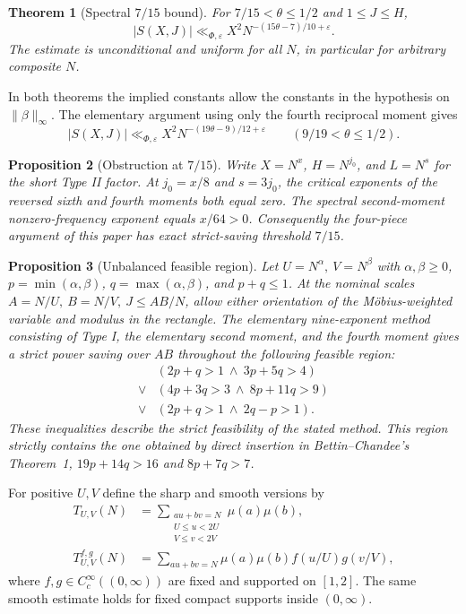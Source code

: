 \documentclass[11pt]{amsart}
\numberwithin{equation}{section}
\newtheorem{theorem}{Theorem}[section]
\newtheorem{proposition}[theorem]{Proposition}
\theoremstyle{remark}
\begin{document}
\begin{theorem}[Spectral \(7/15\) bound]\label{thm:spectral}
For \(7/15<\theta\le1/2\) and \(1\le J\le H\),
\[
 |S(X,J)|\ll_{\Phi,\varepsilon} X^2 N^{-(15\theta-7)/10+\varepsilon}.
\]
The estimate is unconditional and uniform for all \(N\), in particular
for arbitrary composite \(N\).
\end{theorem}

In both theorems the implied constants allow the constants in the
hypothesis on \(\|\beta\|_\infty\). The elementary argument using only
the fourth reciprocal moment gives
\[
 |S(X,J)|\ll_{\Phi,\varepsilon}X^2N^{-(19\theta-9)/12+\varepsilon}
 \qquad(9/19<\theta\le1/2).
\]

\begin{proposition}[Obstruction at \(7/15\)]\label{prop:obstruction}
Write \(X=N^x\), \(H=N^{j_0}\), and \(L=N^s\) for the short Type II
factor. At \(j_0=x/8\) and \(s=3j_0\), the critical exponents of
the reversed sixth and fourth moments both equal zero. The spectral
second-moment nonzero-frequency exponent equals \(x/64>0\).
Consequently the four-piece argument of this paper has exact
strict-saving threshold \(7/15\).
\end{proposition}

\begin{proposition}[Unbalanced feasible region]\label{prop:unbalanced}
Let \(U=N^\alpha,\ V=N^\beta\) with \(\alpha,\beta\ge0\),
\(p=\min(\alpha,\beta)\), \(q=\max(\alpha,\beta)\), and \(p+q\le1\).
At the nominal scales \(A=N/U,\ B=N/V,\ J\le AB/N\), allow either
orientation of the M\"obius-weighted variable and modulus in the
rectangle. The elementary nine-exponent method consisting of Type I,
the elementary second moment, and the fourth moment gives a strict
power saving over \(AB\) throughout the following feasible region:
\begin{equation}\label{eq:region}
\begin{aligned}
 &(2p+q>1\ \land\ 3p+5q>4)\\
 {}\lor{}&(4p+3q>3\ \land\ 8p+11q>9)\\
 {}\lor{}&(2p+q>1\ \land\ 2q-p>1).
\end{aligned}
\end{equation}
These inequalities describe the strict feasibility of the stated
method. This region strictly contains the one obtained by direct
insertion in Bettin--Chandee's Theorem~1,
\(19p+14q>16\) and \(8p+7q>7\).
\end{proposition}

For positive \(U,V\) define the sharp and smooth versions by
\begin{align}
 T_{U,V}(N)&=\sum_{\substack{au+bv=N\\ U\le u<2U\\ V\le v<2V}}
                    \mu(a)\mu(b), \label{eq:sharpT}\\
 T_{U,V}^{f,g}(N)&=\sum_{au+bv=N}\mu(a)\mu(b)f(u/U)g(v/V),
 \label{eq:smoothT}
\end{align}
where \(f,g\in C_c^\infty((0,\infty))\) are fixed and supported on
\([1,2]\). The same smooth estimate holds for fixed compact supports
inside \((0,\infty)\).
\end{document}
